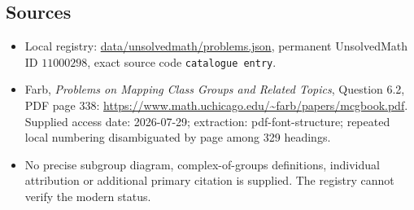 \documentclass[11pt]{article}
\begin{document}
\subsection{Sources}
\begin{itemize}
\item Local registry: \url{data/unsolvedmath/problems.json}, permanent UnsolvedMath ID $11000298$, exact source code \texttt{catalogue entry}.
\item Farb, \emph{Problems on Mapping Class Groups and Related Topics}, Question 6.2, PDF page 338: \url{https://www.math.uchicago.edu/~farb/papers/mcgbook.pdf}. Supplied access date: 2026-07-29; extraction: pdf-font-structure; repeated local numbering disambiguated by page among 329 headings.
\item No precise subgroup diagram, complex-of-groups definitions, individual attribution or additional primary citation is supplied. The registry cannot verify the modern status.
\end{itemize}
\end{document}
